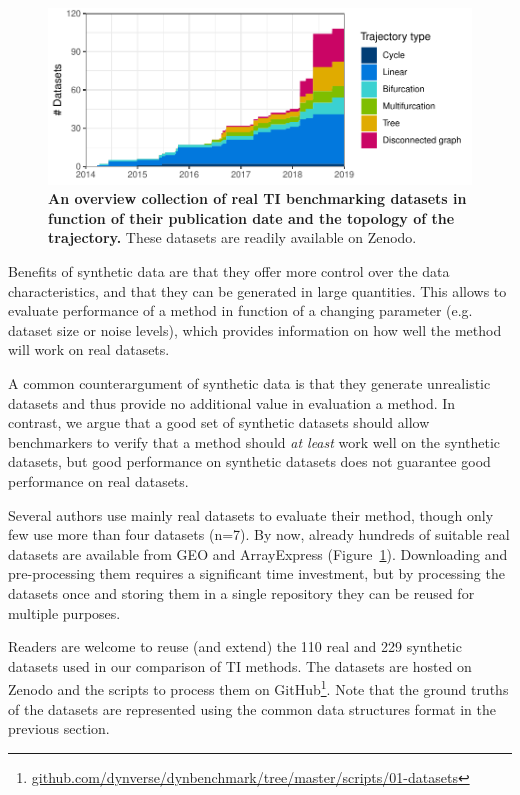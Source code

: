 \begin{figure}[htb!]
	\centering
	\includegraphics[width=.75\linewidth]{fig/datasets.pdf} 
	\caption{\textbf{An overview collection of real TI benchmarking datasets in function of their publication date and the topology of the trajectory.} These datasets are readily available on Zenodo\cite{cannoodt_singlecellomicsdatasets_2018}.}
	\label{fig:datasets}
\end{figure}

Benefits of synthetic data are that they offer more control over the data characteristics, and that they can be generated in large quantities. This allows to evaluate performance of a method in function of a changing parameter (e.g. dataset size or noise levels), which provides information on how well the method will work on real datasets.

A common counterargument of synthetic data is that they generate unrealistic datasets and thus provide no additional value in evaluation a method. In contrast, we argue that a good set of synthetic datasets should allow benchmarkers to verify that a method should \textit{at least} work well on the synthetic datasets, but good performance on synthetic datasets does not guarantee good performance on real datasets.

Several authors use mainly real datasets to evaluate their method, though only few use more than four datasets (n=7). 
By now, already hundreds of suitable real datasets are available from GEO and ArrayExpress (Figure~\ref{fig:datasets}). Downloading and pre-processing them requires a significant time investment, but by processing the datasets once and storing them in a single repository they can be reused for multiple purposes.

Readers are welcome to reuse (and extend) the 110 real and 229 synthetic datasets used in our comparison of TI methods. The datasets are hosted on Zenodo\cite{cannoodt_singlecellomicsdatasets_2018} and the scripts to process them on GitHub\footnote{\href{https://github.com/dynverse/dynbenchmark/tree/master/scripts/01-datasets}{github.com/dynverse/dynbenchmark/tree/master/scripts/01-datasets}}. Note that the ground truths of the datasets are represented using the common data structures format in the previous section.



